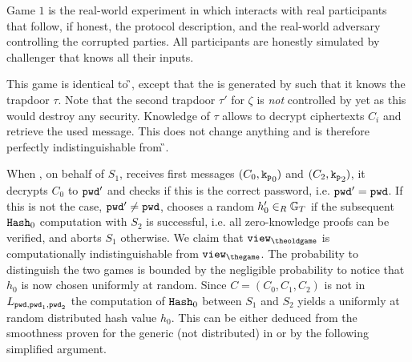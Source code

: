\Gh Game $1$ is the real-world experiment in which \cZ interacts with real participants that follow, if honest, the protocol description, and the real-world adversary \cA controlling the corrupted parties.
All participants are honestly simulated by challenger \cC that knows all their inputs.

\Gh This game is identical to \G{\theoldgame}, except that the \crs is generated by \cC such that it knows the trapdoor $\tau$.
Note that the second trapdoor $\tau'$ for $\zeta$ is \emph{not} controlled by \cC yet as this would destroy any security.
Knowledge of $\tau$ allows \cC to decrypt ciphertexts $C_i$ and retrieve the used message.
This does not change anything and is therefore perfectly indistinguishable from \G{\theoldgame}.

\Gh When \cC, on behalf of $S_1$, receives first messages $(C_0, \mathtt{k_p}_0)$ and $(C_2, \mathtt{k_p}_2)$, it decrypts $C_0$ to $\mathtt{pwd}'$ and checks if this is the correct password, i.e. $\mathtt{pwd}'=\mathtt{pwd}$.
If this is not the case, $\mathtt{pwd}'\not=\mathtt{pwd}$, \cC chooses a random $h'_0\in_R\mathbb{G}_T$ if the subsequent $\mathtt{Hash}_0$ computation with $S_2$ is successful, i.e. all zero-knowledge proofs can be verified, and aborts $S_1$ otherwise.
We claim that $\view_{\theoldgame}$ is computationally indistinguishable from $\view_{\thegame}$.
The probability to distinguish the two games is bounded by the negligible probability to notice that $h_0$ is now chosen uniformly at random.
Since $C=(C_0, C_1, C_2)$ is not in $L_{\mathtt{pwd}, \mathtt{pwd}_1, \mathtt{pwd}_2}$ the computation of $\mathtt{Hash}_0$ between $S_1$ and $S_2$ yields a uniformly at random distributed hash value $h_0$.
This can be either deduced from the smoothness proven for the generic (not distributed) \TSPHF in \cite{Benhamouda_Pointcheval_2013} or by the following simplified argument.
